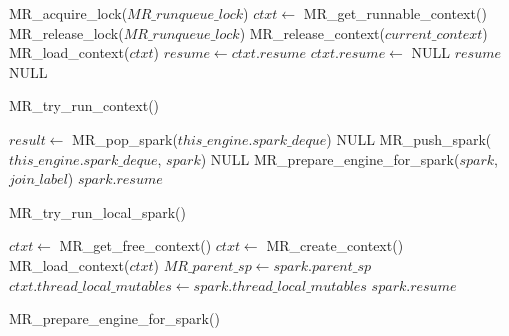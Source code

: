 %
%
\begin{float}[p]

\begin{algorithm}[H]
\begin{algorithmic}
    \State MR\_acquire\_lock($MR\_runqueue\_lock$)
    \State $ctxt \gets$ MR\_get\_runnable\_context()
    \State MR\_release\_lock($MR\_runqueue\_lock$)
            \State MR\_release\_context($current\_context$)
        \EndIf
        \State MR\_load\_context($ctxt$)
        \State $resume \gets ctxt.resume$
        \State $ctxt.resume \gets$ NULL
        \State \Return $resume$
    \Else
        \State \Return NULL
    \EndIf
\EndProcedure
\end{algorithmic}
\caption{MR\_try\_run\_context()}
\label{alg:try_run_context}
\end{algorithm}

\begin{algorithm}[H]
\begin{algorithmic}
    \State $result \gets$ MR\_pop\_spark($this\_engine.spark\_deque$)
        \State \Return NULL
    \EndIf
        \State MR\_push\_spark($this\_engine.spark\_deque$, $spark$)
        \State \Return NULL
    \EndIf
    \State MR\_prepare\_engine\_for\_spark($spark$, $join\_label$)
    \State \Return $spark.resume$
\EndProcedure
\end{algorithmic}
\caption{MR\_try\_run\_local\_spark()}
\label{alg:try_run_local_spark}
\end{algorithm}

\begin{algorithm}[H]
\begin{algorithmic}
        \State $ctxt \gets$ MR\_get\_free\_context()
            \State $ctxt \gets$ MR\_create\_context()
        \EndIf
        \State MR\_load\_context($ctxt$)
    \EndIf
    \State $MR\_parent\_sp \gets spark.parent\_sp$
    \State $ctxt.thread\_local\_mutables \gets
      spark.thread\_local\_mutables$
    \State \Return $spark.resume$
\EndProcedure
\end{algorithmic}
\caption{MR\_prepare\_engine\_for\_spark()}
\label{alg:prepare_engine_for_spark}
\end{algorithm}

\end{float}

